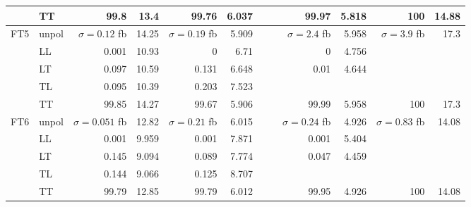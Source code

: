 \begin{table}[H]
{\begin{tabular}{llrrrrrrrrrr}
 & TT & \num{99.8} & \num{13.4} & \num{99.76} & \num{6.037} &  &  & \num{99.97} & \num{5.818} & \num{100} & \num{14.88} \\
\midrule
\multirow{5}{*}{FT5}
 & unpol & $\sigma = \num{0.12}$ fb & \num{14.25} & $\sigma = \num{0.19}$ fb & \num{5.909} &  &  & $\sigma = \num{2.4}$ fb & \num{5.958} & $\sigma = \num{3.9}$ fb & \num{17.3} \\
 & LL & \num{0.001} & \num{10.93} & \num{0} & \num{6.71} &  &  & \num{0} & \num{4.756} &  &  \\
 & LT & \num{0.097} & \num{10.59} & \num{0.131} & \num{6.648} &  &  & \num{0.01} & \num{4.644} &  &  \\
 & TL & \num{0.095} & \num{10.39} & \num{0.203} & \num{7.523} &  &  &  &  &  &  \\
 & TT & \num{99.85} & \num{14.27} & \num{99.67} & \num{5.906} &  &  & \num{99.99} & \num{5.958} & \num{100} & \num{17.3} \\
\midrule
\multirow{5}{*}{FT6}
 & unpol & $\sigma = \num{0.051}$ fb & \num{12.82} & $\sigma = \num{0.21}$ fb & \num{6.015} &  &  & $\sigma = \num{0.24}$ fb & \num{4.926} & $\sigma = \num{0.83}$ fb & \num{14.08} \\
 & LL & \num{0.001} & \num{9.959} & \num{0.001} & \num{7.871} &  &  & \num{0.001} & \num{5.404} &  &  \\
 & LT & \num{0.145} & \num{9.094} & \num{0.089} & \num{7.774} &  &  & \num{0.047} & \num{4.459} &  &  \\
 & TL & \num{0.144} & \num{9.066} & \num{0.125} & \num{8.707} &  &  &  &  &  &  \\
 & TT & \num{99.79} & \num{12.85} & \num{99.79} & \num{6.012} &  &  & \num{99.95} & \num{4.926} & \num{100} & \num{14.08} \\
\bottomrule
\end{tabular}
}%
\end{table}
\newpage
